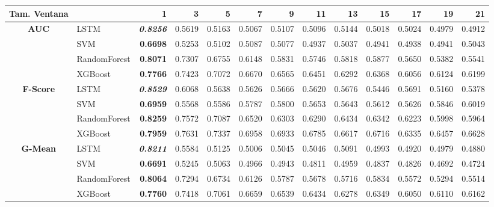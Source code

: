 \begin{table}[H]
	\centering
	\begin{adjustbox}{max width=14cm}
		\begin{tabular}{|c|l|r|r|r|r|r|r|r|r|r|r|r|}
			\hline
			\textbf{Tam. Ventana}&         &      1  &      3  &      5  &      7  &      9  &      11 &      13 &      15 &      17 &      19 &      21 \\
			\hline
			\textbf{AUC} &  LSTM & \textit{ \textbf{  0.8256 } } &  0.5619 &  0.5163 &  0.5067 &  0.5107 &  0.5096 &  0.5144 &  0.5018 &  0.5024 &  0.4979 &  0.4912 \\
			&  SVM & \textbf{  0.6698 } &  0.5253 &  0.5102 &  0.5087 &  0.5077 &  0.4937 &  0.5037 &  0.4941 &  0.4938 &  0.4941 &  0.5043 \\
			&  RandomForest & \textbf{  0.8071 } &  0.7307 &  0.6755 &  0.6148 &  0.5831 &  0.5746 &  0.5818 &  0.5877 &  0.5650 &  0.5382 &  0.5541 \\
			&  XGBoost & \textbf{  0.7766 } &  0.7423 &  0.7072 &  0.6670 &  0.6565 &  0.6451 &  0.6292 &  0.6368 &  0.6056 &  0.6124 &  0.6199 \\
			\hline
			\textbf{F-Score} &  LSTM & \textit{ \textbf{  0.8529 } } &  0.6068 &  0.5638 &  0.5626 &  0.5666 &  0.5620 &  0.5676 &  0.5446 &  0.5691 &  0.5160 &  0.5378 \\
			&  SVM & \textbf{  0.6959 } &  0.5568 &  0.5586 &  0.5787 &  0.5800 &  0.5653 &  0.5643 &  0.5612 &  0.5626 &  0.5846 &  0.6019 \\
			&  RandomForest & \textbf{  0.8259 } &  0.7572 &  0.7087 &  0.6520 &  0.6303 &  0.6290 &  0.6434 &  0.6342 &  0.6223 &  0.5998 &  0.5964 \\
			&  XGBoost & \textbf{  0.7959 } &  0.7631 &  0.7337 &  0.6958 &  0.6933 &  0.6785 &  0.6617 &  0.6716 &  0.6335 &  0.6457 &  0.6628 \\
			\hline
			\textbf{G-Mean} &  LSTM & \textit{ \textbf{  0.8211 } } &  0.5584 &  0.5125 &  0.5006 &  0.5045 &  0.5046 &  0.5091 &  0.4993 &  0.4920 &  0.4979 &  0.4880 \\
			&  SVM & \textbf{  0.6691 } &  0.5245 &  0.5063 &  0.4966 &  0.4943 &  0.4811 &  0.4959 &  0.4837 &  0.4826 &  0.4692 &  0.4724 \\
			&  RandomForest & \textbf{  0.8064 } &  0.7294 &  0.6734 &  0.6126 &  0.5787 &  0.5678 &  0.5716 &  0.5834 &  0.5572 &  0.5294 &  0.5514 \\
			&  XGBoost & \textbf{  0.7760 } &  0.7418 &  0.7061 &  0.6659 &  0.6539 &  0.6434 &  0.6278 &  0.6349 &  0.6050 &  0.6110 &  0.6162 \\

\end{tabular}
\end{adjustbox}
\end{table}
